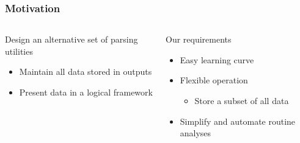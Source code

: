 \begin{frame}
    \frametitle{Motivation}
    \begin{columns}[T]
        \begin{column}{\colShare}
            Design an alternative set of parsing utilities
            \begin{itemize}
                \item Maintain all data stored in outputs
                \item Present data in a logical framework
            \end{itemize}
        \end{column}
        \begin{column}{\colShare}
            Our requirements
            \begin{itemize}
                \item Easy learning curve
                \item Flexible operation
                    \begin{itemize}
                        \item Store a subset of all data
                    \end{itemize}
                \item Simplify and automate routine analyses 
            \end{itemize}
        \end{column}
    \end{columns}
\end{frame}

